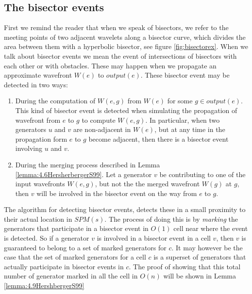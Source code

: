 
\subsection{The bisector events} \label{section:bisectorevents}

First we remind the reader that when we speak of bisectors, we refer to the meeting points of 
two adjacent wavelets along a bisector curve, which divides the area between them with a 
hyperbolic bisector, see figure \ref{fig:bisectorex}. When we talk about bisector events we 
mean the event of intersections of bisectors with each other or with obstacles. These may 
happen when we propagate an approximate wavefront $W(e)$ to $output(e)$. These bisector event 
may be detected in two ways:

\begin{enumerate}
\item During the computation of $W(e,g)$ from $W(e)$ for some $g \in output(e)$. This kind of 
	  bisector event is detected when simulating the propagation of wavefront from $e$ to $g$ 
      to compute $W(e,g)$. In particular, when two generators $u$ and $v$ are non-adjacent in 
      $W(e)$, but at any time in the propagation form $e$ to $g$ become adjacent, then there 
      is a bisector event involving $u$ and $v$.
\item During the merging process described in Lemma \ref{lemma:4.6HersherbergerS99}. Let a 
	  generator $v$ be contributing to one of the input wavefronts $W(e,g)$, but not the the 
      merged wavefront $W(g)$ at $g$, then $v$ will be involved in the bisector event on the 
      way from $e$ to $g$.
\end{enumerate}

The algorithm for detecting bisector events, detects these in a small proximity to their 
actual location in $SPM(s)$. The process of doing this is by \textit{marking} the generators 
that participate in a bisector event in $O(1)$ cell near where the event is detected. So if a 
generator $v$ is involved in a bisector event in a cell $v$, then $v$ is guaranteed to belong 
to a set of marked generators for $c$. It may however be the case that the set of marked 
generators for a cell $c$ is a superset of generators that actually participate in bisector 
events in $c$. The proof of showing that this total number of generator marked in all the cell 
in $O(n)$ will be shown in Lemma \ref{lemma:4.9HershbergerS99}

